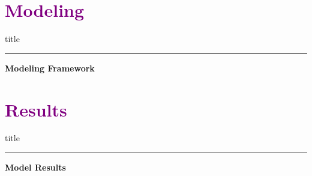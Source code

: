 \documentclass[aspectratio=169]{beamer}
\begin{document}
\section{\textbf{\textcolor{purple}{Modeling}}}
    \begin{frame}[plain]
        \vfill
      \centering
      \begin{beamercolorbox}[sep=8pt,center,shadow=true,rounded=true]{title}
        \insertsectionhead\par%
        \color{oxfordblue}\noindent\rule{10cm}{1pt}
      \end{beamercolorbox}
      \vfill
  \end{frame}


\begin{frame}{\textcolor{cmindsblue}{\textbf{Modeling Framework}}}
    
\end{frame}


\section{\textbf{\textcolor{purple}{Results}}}
    \begin{frame}[plain]
        \vfill
      \centering
      \begin{beamercolorbox}[sep=8pt,center,shadow=true,rounded=true]{title}
        \insertsectionhead\par%
        \color{oxfordblue}\noindent\rule{10cm}{1pt}
      \end{beamercolorbox}
      \vfill
  \end{frame}


\begin{frame}{\textcolor{cmindsblue}{\textbf{Model Results}}}
    
\end{frame}


\end{document}
